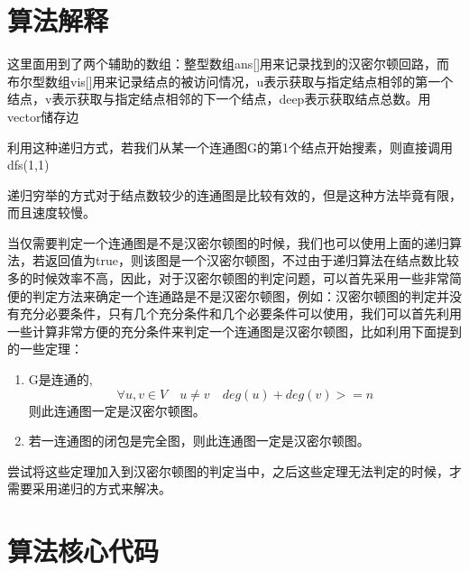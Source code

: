 \documentclass{article}
\begin{document}
\section{算法解释}
这里面用到了两个辅助的数组：整型数组ans[]用来记录找到的汉密尔顿回路，而布尔型数组vis[]用来记录结点的被访问情况，u表示获取与指定结点相邻的第一个结点，v表示获取与指定结点相邻的下一个结点，deep表示获取结点总数。用vector储存边

利用这种递归方式，若我们从某一个连通图G的第1个结点开始搜素，则直接调用dfs(1,1)

递归穷举的方式对于结点数较少的连通图是比较有效的，但是这种方法毕竟有限，而且速度较慢。

当仅需要判定一个连通图是不是汉密尔顿图的时候，我们也可以使用上面的递归算法，若返回值为true，则该图是一个汉密尔顿图，不过由于递归算法在结点数比较多的时候效率不高，因此，对于汉密尔顿图的判定问题，可以首先采用一些非常简便的判定方法来确定一个连通路是不是汉密尔顿图，例如：汉密尔顿图的判定并没有充分必要条件，只有几个充分条件和几个必要条件可以使用，我们可以首先利用一些计算非常方便的充分条件来判定一个连通图是汉密尔顿图，比如利用下面提到的一些定理：
\begin{enumerate}
    \item G是连通的,$$\forall u,v \in V \quad u\neq v \quad 
    deg(u)+deg(v)>=n$$则此连通图一定是汉密尔顿图。 
    \item 若一连通图的闭包是完全图，则此连通图一定是汉密尔顿图。 
\end{enumerate}
尝试将这些定理加入到汉密尔顿图的判定当中，之后这些定理无法判定的时候，才需要采用递归的方式来解决。

\section{算法核心代码}
    
\end{document}
